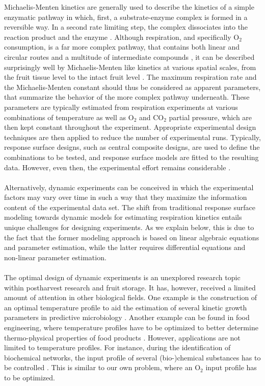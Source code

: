 Michaelis-Menten kinetics are generally used to describe the kinetics of a simple enzymatic pathway in which, first, a substrate-enzyme complex is formed in a reversible way. In a second rate limiting step, the complex dissociates into the reaction product and the enzyme \parencite{michaelismenten}. Although respiration, and specifically $\text{O}_2$ consumption, is a far more complex pathway, that contains both linear and circular routes and a multitude of intermediate compounds \parencite{berg}, it can be described surprisingly well by Michaelis-Menten like kinetics at various spatial scales, from the fruit tissue level to the intact fruit level \parencite{tri}. The maximum respiration rate and the Michaelis-Menten constant should thus be considered as apparent parameters, that summarize the behavior of the more complex pathway underneath. These parameters are typically estimated from respiration experiments at various combinations of temperature as well as $\text{O}_2$ and $\text{CO}_2$ partial pressure, which are then kept constant throughout the experiment. Appropriate experimental design techniques are then applied to reduce the number of experimental runs. Typically, response surface designs, such as central composite designs, are used to define the combinations to be tested, and response surface models are fitted to the resulting data. However, even then, the experimental effort remains considerable {\parencite{fidler,saltveit}}.
\\
\\
Alternatively, dynamic experiments can be conceived in which the experimental factors may vary over time in such a way that they maximize the information content of the experimental data set. The shift from traditional response surface modeling towards dynamic models for estimating  respiration kinetics entails unique challenges for designing experiments. As we explain below, this is due to the fact that the former modeling approach is based on linear algebraic equations and parameter estimation, while the latter requires differential equations and non-linear parameter estimation. 
\\
\\
The optimal design of dynamic experiments is an unexplored research topic within postharvest research and fruit storage. It has, however, received a limited amount of attention in other biological fields. One example is the construction of an optimal temperature profile to aid the estimation of several kinetic growth parameters in predictive microbiology \parencite{bernaerts1,bernaerts2,balsa1}. Another example can be found in food engineering, where temperature profiles have to be optimized to better determine thermo-physical properties of food products \parencite{nahor1,nahor2}. However, applications are not limited to temperature profiles. For instance, during the identification of biochemical networks, the input profile of several (bio-)chemical substances has to be controlled \parencite{balsa2}. This is similar to our own problem, where an $\text{O}_2$ input profile has to be optimized.
